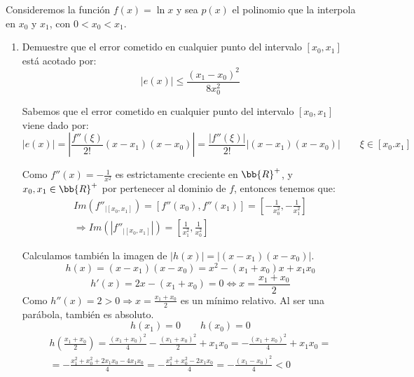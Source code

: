 \begin{ejercicio}
    Consideremos la función $f(x) = \ln x$ y sea $p(x)$ el polinomio que la interpola en $x_0$ y $x_1$, con $0<x_0<x_1$.

    \begin{enumerate}
        \item Demuestre que el error cometido en cualquier punto del intervalo $[x_0, x_1]$ está acotado por:
        \begin{equation*}
            |e(x)|\leq \frac{(x_1-x_0)^2}{8x_0^2}
        \end{equation*}

        Sabemos que el error cometido en cualquier punto del intervalo $[x_0, x_1]$ viene dado por:
        \begin{equation*}
            |e(x)| = \left| \frac{f''(\xi)}{2!}(x-x_1)(x-x_0)\right| =  \frac{\left|f''(\xi)\right|}{2!}\left|(x-x_1)(x-x_0)\right| \qquad \xi\in [x_0.x_1]
        \end{equation*}

        Como $f''(x)=-\frac{1}{x^2}$ es estrictamente creciente en $\bb{R}^+$, y $x_0,x_1\in \bb{R}^+$ por pertenecer al dominio de $f$, entonces tenemos que:
        \begin{multline*}
            Im \left(f''_{\left|[x_0,x_1] \right.} \right) = \left[f''(x_0), f''(x_1)\right] = \left[-\frac{1}{x_0^2}, -\frac{1}{x_1^2}\right]
            \\ \Longrightarrow
            Im \left(\left|f''_{\left|[x_0,x_1] \right.}\right| \right) = \left[\frac{1}{x_1^2}, \frac{1}{x_0^2}\right]
        \end{multline*}

        Calculamos también la imagen de $|h(x)|=|(x-x_1)(x-x_0)|$.
        \begin{equation*}
            h(x)=(x-x_1)(x-x_0)=x^2 -(x_1+x_0)x + x_1x_0
        \end{equation*}
        \begin{equation*}
            h'(x) = 2x -(x_1+x_0) = 0 \Longleftrightarrow x=\frac{x_1+x_0}{2}
        \end{equation*}
        Como $h''(x) = 2>0 \Longrightarrow x=\frac{x_1+x_0}{2}$ es un mínimo relativo. Al ser una parábola, también es absoluto.
        \begin{equation*}
            h(x_1) = 0 \qquad h(x_0) = 0
        \end{equation*}
        \begin{multline*}
            h\left(\frac{x_1+x_0}{2}\right) = \frac{(x_1+x_0)^2}{4} - \frac{(x_1+x_0)^2}{2} + x_1x_0 = -\frac{(x_1+x_0)^2}{4} + x_1x_0 =\\= -\frac{x_1^2+x_0^2+2x_1x_0-4x_1x_0}{4} =-\frac{x_1^2+x_0^2-2x_1x_0}{4} = -\frac{(x_1-x_0)^2}{4} < 0
        \end{multline*}


\end{enumerate}
\end{ejercicio}
